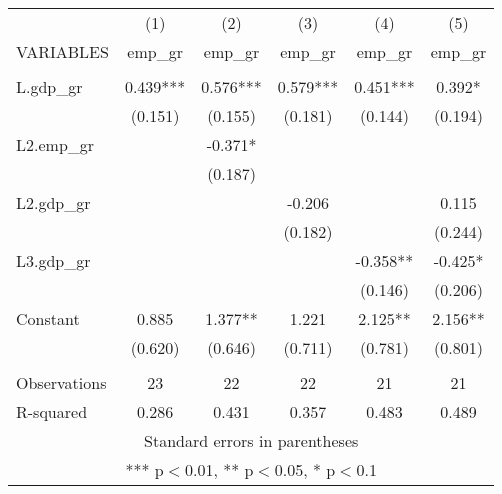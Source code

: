 \documentclass[]{article}
\begin{document}
\begin{tabular}{lccccc} \hline
 & (1) & (2) & (3) & (4) & (5) \\
VARIABLES & emp\_gr & emp\_gr & emp\_gr & emp\_gr & emp\_gr \\ \hline
 &  &  &  &  &  \\
L.gdp\_gr & 0.439*** & 0.576*** & 0.579*** & 0.451*** & 0.392* \\
 & (0.151) & (0.155) & (0.181) & (0.144) & (0.194) \\
L2.emp\_gr &  & -0.371* &  &  &  \\
 &  & (0.187) &  &  &  \\
L2.gdp\_gr &  &  & -0.206 &  & 0.115 \\
 &  &  & (0.182) &  & (0.244) \\
L3.gdp\_gr &  &  &  & -0.358** & -0.425* \\
 &  &  &  & (0.146) & (0.206) \\
Constant & 0.885 & 1.377** & 1.221 & 2.125** & 2.156** \\
 & (0.620) & (0.646) & (0.711) & (0.781) & (0.801) \\
 &  &  &  &  &  \\
Observations & 23 & 22 & 22 & 21 & 21 \\
 R-squared & 0.286 & 0.431 & 0.357 & 0.483 & 0.489 \\ \hline
\multicolumn{6}{c}{ Standard errors in parentheses} \\
\multicolumn{6}{c}{ *** p$<$0.01, ** p$<$0.05, * p$<$0.1} \\
\end{tabular}
\end{document}

